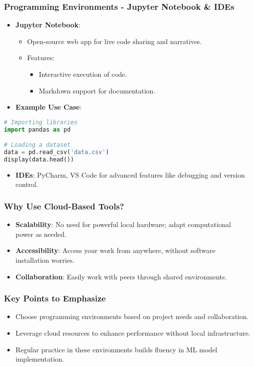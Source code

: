 \documentclass[aspectratio=169]{beamer}
\begin{document}
\begin{frame}[fragile]
    \frametitle{Programming Environments - Jupyter Notebook \& IDEs}
    \begin{itemize}
        \item \textbf{Jupyter Notebook}:
            \begin{itemize}
                \item Open-source web app for live code sharing and narratives.
                \item Features:
                    \begin{itemize}
                        \item Interactive execution of code.
                        \item Markdown support for documentation.
                    \end{itemize}
            \end{itemize}
            \item \textbf{Example Use Case}:
    \end{itemize}
    \begin{lstlisting}[language=Python]
# Importing libraries
import pandas as pd

# Loading a dataset
data = pd.read_csv('data.csv')
display(data.head())
    \end{lstlisting}

    \begin{itemize}
        \item \textbf{IDEs}: PyCharm, VS Code for advanced features like debugging and version control.
    \end{itemize}
\end{frame}

\begin{frame}[fragile]
    \frametitle{Why Use Cloud-Based Tools?}
    \begin{itemize}
        \item \textbf{Scalability}: No need for powerful local hardware; adapt computational power as needed.
        \item \textbf{Accessibility}: Access your work from anywhere, without software installation worries.
        \item \textbf{Collaboration}: Easily work with peers through shared environments.
    \end{itemize}
\end{frame}

\begin{frame}[fragile]
    \frametitle{Key Points to Emphasize}
    \begin{itemize}
        \item Choose programming environments based on project needs and collaboration.
        \item Leverage cloud resources to enhance performance without local infrastructure.
        \item Regular practice in these environments builds fluency in ML model implementation.
    \end{itemize}
\end{frame}
\end{document}
